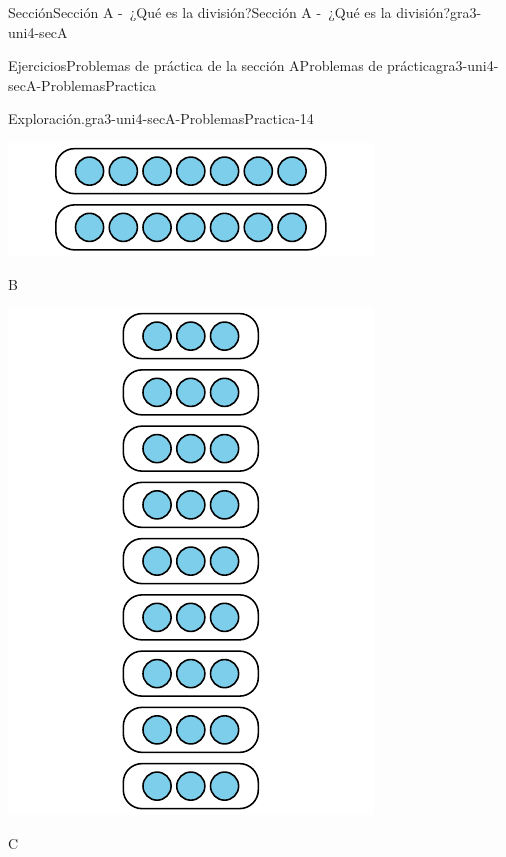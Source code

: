\begin{sectionptx}{Sección}{Sección A -~¿Qué es la división?}{}{Sección A -~¿Qué es la división?}{}{}{gra3-uni4-secA}
\begin{exercises-subsection}{Ejercicios}{Problemas de práctica de la sección A}{}{Problemas de práctica}{}{}{gra3-uni4-secA-ProblemasPractica}
\begin{divisionexercise}{12}{Exploración.}{}{gra3-uni4-secA-ProblemasPractica-14}
\begin{sidebyside}{3}{0}{0}{0.02}
\begin{sbspanel}{0.32}
\par
\includegraphics[max width=\linewidth, center]{external/svg-source/tikz-file-151674.pdf}
\end{sbspanel}%
\begin{sbspanel}{0.32}%
B%
\par
\includegraphics[max width=\linewidth, center]{external/svg-source/tikz-file-151675.pdf}
\end{sbspanel}%
\begin{sbspanel}{0.32}%
C%
\par

\end{sbspanel}
\end{sidebyside}
\end{divisionexercise}
\end{exercises-subsection}
\end{sectionptx}
